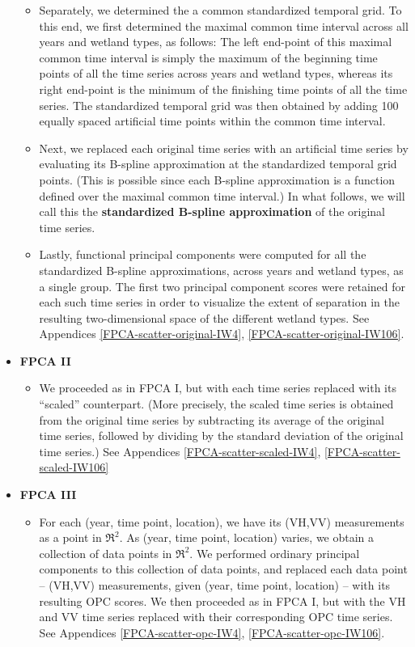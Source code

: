 \begin{itemize}
\begin{itemize}
	\item
		Separately, we determined the a common standardized temporal grid.
		To this end, we first determined the maximal common time interval
		across all years and wetland types, as follows:
		The left end-point of this maximal common time interval is simply the maximum of the beginning time points
		of all the time series across years and wetland types,
		whereas its right end-point is the minimum of the finishing time points of all the time series.
		The standardized temporal grid was then obtained by adding 100 equally spaced
		artificial time points within the common time interval.

	\item
		Next, we replaced each original time series with an artificial time series by evaluating its
		B-spline approximation at the standardized temporal grid points.
		(This is possible since each B-spline approximation is a function
		defined over the maximal common time interval.)
		In what follows, we will call this the
		\textbf{standardized B-spline approximation}
		of the original time series.

	\item
		Lastly, functional principal components were computed for all the
		standardized B-spline approximations, across years and wetland types, as a single group.
		The first two principal component scores were retained for each such time series
		in order to visualize the extent of separation in the resulting two-dimensional space
		of the different wetland types.
		See Appendices \ref{FPCA-scatter-original-IW4}, \ref{FPCA-scatter-original-IW106}.
	\end{itemize}

\item
	\textbf{FPCA II}
	\begin{itemize}
	\item
		We proceeded as in FPCA I, but with each time series replaced
		with its ``scaled'' counterpart.
		(More precisely, the scaled time series is obtained from the original time series
		by subtracting its average of the original time series, followed by
		dividing by the standard deviation of the original time series.)
		See Appendices \ref{FPCA-scatter-scaled-IW4}, \ref{FPCA-scatter-scaled-IW106}
	\end{itemize}

\item
	\textbf{FPCA III}
	\begin{itemize}
	\item
		For each (year, time point, location), we have its (VH,VV) measurements as a point in $\Re^{2}$.
		As (year, time point, location) varies, we obtain a collection of data points in $\Re^{2}$.
		We performed ordinary principal components to this collection of data points,
		and replaced each data point -- (VH,VV) measurements, given (year, time point, location) --
		with its resulting OPC scores.
		We then proceeded as in FPCA I, but with the VH and VV time series replaced
		with their corresponding OPC time series.
		See Appendices \ref{FPCA-scatter-opc-IW4}, \ref{FPCA-scatter-opc-IW106}.
	\end{itemize}


\end{itemize}
